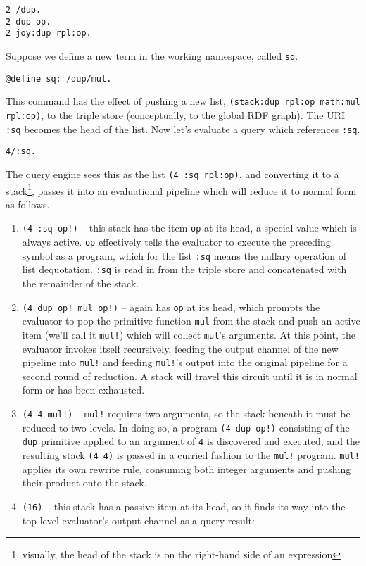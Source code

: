 \documentclass[runningheads]{llncs}
\begin{document}
\begin{verbatim}
2 /dup.
2 dup op.
2 joy:dup rpl:op.
\end{verbatim}


Suppose we define a new term in the working namespace, called \texttt{sq}.

\begin{verbatim}
@define sq: /dup/mul.
\end{verbatim}

This command has the effect of pushing a new list, \texttt{(stack:dup rpl:op math:mul rpl:op)}, to the triple store (conceptually, to the global RDF graph).  The URI \texttt{:sq} becomes the head of the list.  Now let's evaluate a query which references \texttt{:sq}.

\begin{verbatim}
4/:sq.
\end{verbatim}

The query engine sees this as the list \texttt{(4 :sq rpl:op)}, and converting it to a stack\footnote{visually, the head of the stack is on the right-hand side of an expression}, passes it into an evaluational pipeline which will reduce it to normal form as follows.

\begin{enumerate}
\item \texttt{(4 :sq op!)} -- this stack has the item \texttt{op} at its head, a special value which is always active.  \texttt{op} effectively tells the evaluator to execute the preceding symbol as a program, which for the list \texttt{:sq} means the nullary operation of list dequotation.  \texttt{:sq} is read in from the triple store and concatenated with the remainder of the stack.
\item \texttt{(4 dup op! mul op!)} -- again has \texttt{op} at its head, which prompts the evaluator to pop the primitive function \texttt{mul} from the stack and push an active item (we'll call it \texttt{mul!}) which will collect \texttt{mul}'s arguments.  At this point, the evaluator invokes itself recursively, feeding the output channel of the new pipeline into \texttt{mul!} and feeding \texttt{mul!}'s output into the original pipeline for a second round of reduction.  A stack will travel this circuit until it is in normal form or has been exhausted.
\item \texttt{(4 4 mul!)} -- \texttt{mul!} requires two arguments, so the stack beneath it must be reduced to two levels.  In doing so, a program \texttt{(4 dup op!)} consisting of the \texttt{dup} primitive applied to an argument of \texttt{4} is discovered and executed, and the resulting stack \texttt{(4 4)} is passed in a curried fashion to the \texttt{mul!} program.  \texttt{mul!} applies its own rewrite rule, consuming both integer arguments and pushing their product onto the stack.
\item \texttt{(16)} -- this stack has a passive item at its head, so it finds its way into the top-level evaluator's output channel as a query result:
\end{enumerate}
\end{document}
